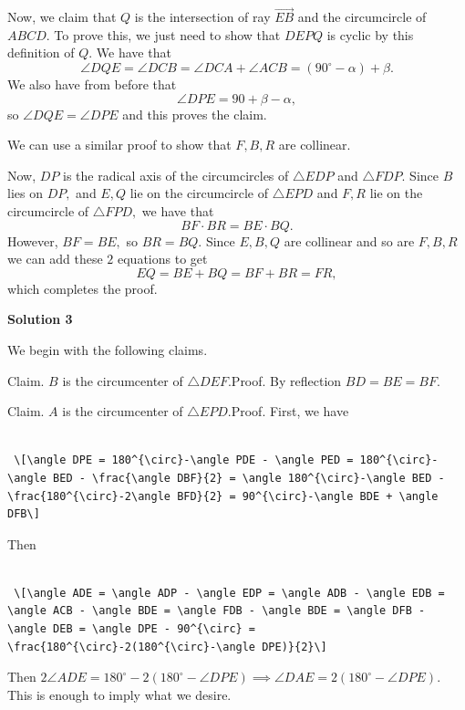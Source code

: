 \begin{enumerate}
 Now, we claim that $Q$ is the intersection of ray $\overrightarrow{EB}$ and the circumcircle of $ABCD.$ To prove this, we just need to show that $DEPQ$ is cyclic by this definition of $Q.$ We have that 
 \[\angle DQE = \angle DCB = \angle DCA + \angle ACB = (90^{\circ}-\alpha)+\beta.\] We also have from before that 
 \[\angle DPE = 90+\beta-\alpha,\] so $\angle DQE=\angle DPE$ and this proves the claim.

 We can use a similar proof to show that $F, B, R$ are collinear.

 Now, $DP$ is the radical axis of the circumcircles of $\triangle EDP$ and $\triangle FDP.$ Since $B$ lies on $DP,$ and $E, Q$ lie on the circumcircle of $\triangle EPD$ and $F, R$ lie on the circumcircle of $\triangle FPD,$ we have that 
 \[BF \cdot BR = BE \cdot BQ.\] However, $BF=BE,$ so $BR=BQ.$ Since $E, B, Q$ are collinear and so are $F, B, R$ we can add these $2$ equations to get 
 \[EQ=BE+BQ=BF+BR=FR,\] which completes the proof.

 



\textbf{Solution 3}

We begin with the following claims.

 Claim. $B$ is the circumcenter of $\triangle DEF$.Proof. By reflection $BD=BE=BF$.

 Claim. $A$ is the circumcenter of $\triangle EPD$.Proof. First, we have

 \begin{verbatim}

 \[\angle DPE = 180^{\circ}-\angle PDE - \angle PED = 180^{\circ}-\angle BED - \frac{\angle DBF}{2} = \angle 180^{\circ}-\angle BED - \frac{180^{\circ}-2\angle BFD}{2} = 90^{\circ}-\angle BDE + \angle DFB\]
\end{verbatim}

Then

 \begin{verbatim}

 \[\angle ADE = \angle ADP - \angle EDP = \angle ADB - \angle EDB = \angle ACB - \angle BDE = \angle FDB - \angle BDE = \angle DFB - \angle DEB = \angle DPE - 90^{\circ} = \frac{180^{\circ}-2(180^{\circ}-\angle DPE)}{2}\]
\end{verbatim}

Then $2\angle ADE = 180^{\circ}-2(180^{\circ}-\angle DPE) \implies \angle DAE = 2(180^{\circ}-\angle DPE)$. This is enough to imply what we desire. \newline


\end{enumerate}
